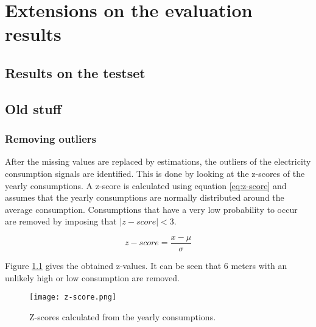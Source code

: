\chapter{Extensions on the evaluation results}
\label{app:Extensions on the evaluation results}

\section{Results on the testset}



\section{Old stuff}
\subsection{Removing outliers}


After the missing values are replaced by estimations, the outliers of the electricity consumption signals are identified.
This is done by looking  at the z-scores of the yearly consumptions. A z-score is calculated using equation \ref{eq:z-score} and assumes that the yearly consumptions are normally distributed around the average consumption. Consumptions that have a very low probability to occur are removed by imposing that $ |z-score| < 3 $.

\begin{equation}
	z-score = \frac{x-\mu}{\sigma}
\end{equation}                      

Figure \ref{fig:z-score} gives the obtained z-values. It can be seen that $ 6 $ meters with an unlikely high or low consumption are removed. 

\begin{figure}[h!]
	\centering
	\texttt{[image: z-score.png]}
	\caption{Z-scores calculated from the yearly consumptions.}
	\label{fig:z-score}
\end{figure}


